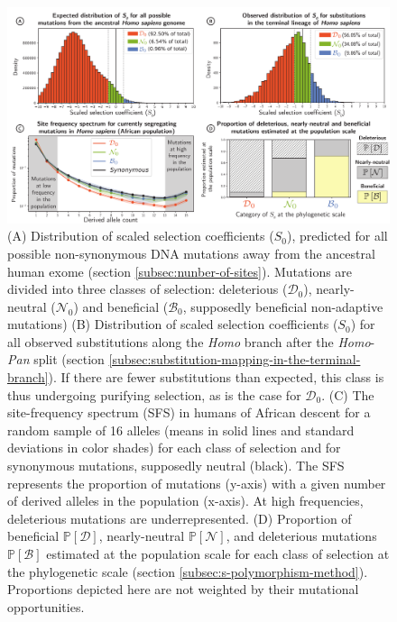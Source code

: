 \documentclass{article}
\newcommand{\proba}{\mathbb{P}}
\newcommand{\Sphy}{S_{0}}
\newcommand{\SphyDel}{\mathcal{D}_0}
\newcommand{\SphyNeu}{\mathcal{N}_0}
\newcommand{\SphyBen}{\mathcal{B}_0}
\newcommand{\SpopDel}{\mathcal{D}}
\newcommand{\SpopNeu}{\mathcal{N}}
\newcommand{\SpopBen}{\mathcal{B}}
\newcommand{\ProbaPopDel}{\proba [ \SpopDel]}
\newcommand{\ProbaPopNeu}{\proba [ \SpopNeu ]}
\newcommand{\ProbaPopBen}{\proba [ \SpopBen ]}
\begin{document}
    \begin{figure}[!h]
        \centering
        \includegraphics[width=\textwidth, page=1] {artworks/figure.homo-afr-results}
        \caption{
            (A) Distribution of scaled selection coefficients ($\Sphy$), predicted for all possible non-synonymous DNA mutations away from the ancestral human exome (section \ref{subsec:nunber-of-sites}).
            Mutations are divided into three classes of selection: deleterious ($\SphyDel$), nearly-neutral ($\SphyNeu$) and beneficial ($\SphyBen$, supposedly beneficial non-adaptive mutations)
            (B) Distribution of scaled selection coefficients ($\Sphy$) for all observed substitutions along the \textit{Homo} branch after the \textit{Homo}-\textit{Pan} split (section \ref{subsec:substitution-mapping-in-the-terminal-branch}).
            If there are fewer substitutions than expected, this class is thus undergoing purifying selection, as is the case for $\SphyDel$.
            (C) The site-frequency spectrum (SFS) in humans of African descent for a random sample of 16 alleles (means in solid lines and standard deviations in color shades) for each class of selection and for synonymous mutations, supposedly neutral (black). The SFS represents the proportion of mutations (y-axis) with a given number of derived alleles in the population (x-axis).
            At high frequencies, deleterious mutations are underrepresented.
            (D) Proportion of beneficial $\ProbaPopDel$, nearly-neutral $\ProbaPopNeu$, and deleterious mutations $\ProbaPopBen$ estimated at the population scale for each class of selection at the phylogenetic scale (section \ref{subsec:s-polymorphism-method}). Proportions depicted here are not weighted by their mutational opportunities.
        }
        \label{fig:homo-afr-results}
    \end{figure}
\end{document}
